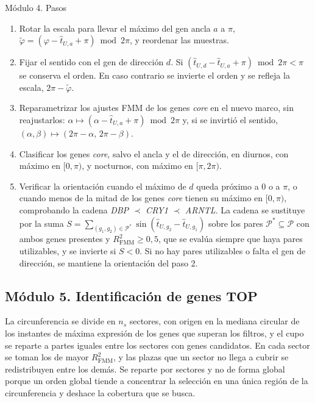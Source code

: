 \documentclass[12pt, a4paper]{report}
\newcommand{\nuevo}[1]{\textcolor{cnuevo}{#1}}
\newenvironment{pasos}{\begin{enumerate}[nosep,leftmargin=1.5em,label=\arabic*.]}{\end{enumerate}}
\begin{document}
\begin{panel}{Módulo 4. Pasos}
\begin{pasos}
\item Rotar la escala para llevar el máximo del gen ancla \(a\) a \(\pi\), \(\widetilde{\varphi}=(\varphi-\widehat{t}_{U,a}+\pi)\bmod 2\pi\), y reordenar las muestras.
\item Fijar el sentido con el gen de dirección \(d\). Si \((\widehat{t}_{U,d}-\widehat{t}_{U,a}+\pi)\bmod 2\pi<\pi\) se conserva el orden. En caso contrario se invierte el orden y se refleja la escala, \(2\pi-\widetilde{\varphi}\).
\item Reparametrizar los ajustes FMM de los genes \textit{core} en el nuevo marco, sin reajustarlos: \(\alpha\mapsto(\alpha-\widehat{t}_{U,a}+\pi)\bmod 2\pi\) y, si se invirtió el sentido, \((\alpha,\beta)\mapsto(2\pi-\alpha,\,2\pi-\beta)\).
\item Clasificar los genes \textit{core}, salvo el ancla y el de dirección, en diurnos, con máximo en \([0,\pi)\), y nocturnos, con máximo en \([\pi,2\pi)\).
\item Verificar la orientación cuando el máximo de \(d\) queda próximo a \(0\) o a \(\pi\), o cuando menos de la mitad de los genes \textit{core} tienen su máximo en \([0,\pi)\), comprobando la cadena \textit{DBP} \(\prec\) \textit{CRY1} \(\prec\) \textit{ARNTL}. \nuevo{La cadena se sustituye por la suma \(S=\sum_{(g_1,g_2)\in\mathcal{P}^{*}}\sin(\widehat{t}_{U,g_2}-\widehat{t}_{U,g_1})\) sobre los pares \(\mathcal{P}^{*}\subseteq\mathcal{P}\) con ambos genes presentes y \(R^2_{\mathrm{FMM}}\geq 0{,}5\), que se evalúa siempre que haya pares utilizables, y se invierte si \(S<0\). Si no hay pares utilizables o falta el gen de dirección, se mantiene la orientación del paso 2.}
\end{pasos}
\end{panel}

\subsection{Módulo 5. Identificación de genes TOP}

La circunferencia se divide en \(n_s\) sectores, con origen en la mediana circular de los instantes de máxima expresión de los genes que superan los filtros, y el cupo se reparte a partes iguales entre los sectores con genes candidatos. En cada sector se toman los de mayor \(R^2_{\mathrm{FMM}}\), y las plazas que un sector no llega a cubrir se redistribuyen entre los demás. Se reparte por sectores y no de forma global porque un orden global tiende a concentrar la selección en una única región de la circunferencia y deshace la cobertura que se busca.
\end{document}
